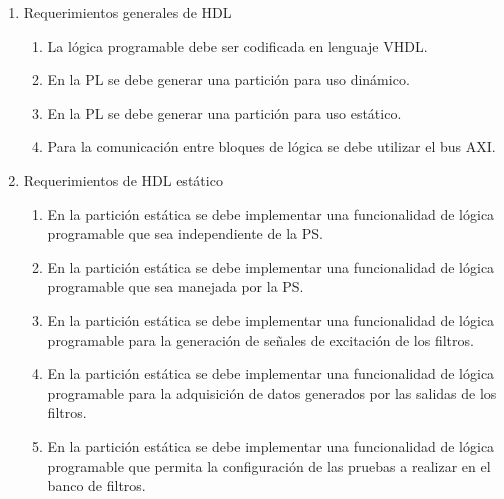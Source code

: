 \documentclass[
11pt, %
]{charter}
\begin{document}
\begin{enumerate}
	\item Requerimientos generales de HDL
	\begin{enumerate}
		\item La lógica programable debe ser codificada en lenguaje VHDL.
		\item En la PL se debe generar una partición para uso dinámico.
		\item En la PL se debe generar una partición para uso estático.
		\item Para la comunicación entre bloques de lógica se debe utilizar el bus AXI.
	\end{enumerate}
	
	\item Requerimientos de HDL estático
	\begin{enumerate}		
		\item En la partición estática se debe implementar una funcionalidad de lógica programable que sea independiente de la PS.
		\item En la partición estática se debe implementar una funcionalidad de lógica programable que sea manejada por la PS.
		\item En la partición estática se debe implementar una funcionalidad de lógica programable para la generación de señales de excitación de los filtros.
		\item En la partición estática se debe implementar una funcionalidad de lógica programable para la adquisición de datos generados por las salidas de los filtros.
		\item En la partición estática se debe implementar una funcionalidad de lógica programable que permita la configuración de las pruebas a realizar en el banco de filtros.
	\end{enumerate}
	

\end{enumerate}
\end{document}
